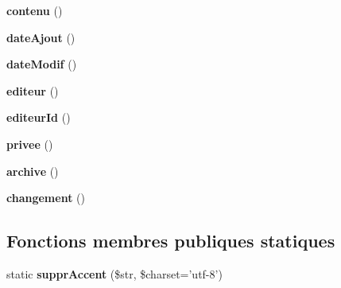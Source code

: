 \begin{DoxyCompactItemize}
\item 
\hypertarget{class_library_1_1_entities_1_1_news_a1837ef17e2289675cef00ceefe715ade}{{\bfseries contenu} ()}\label{class_library_1_1_entities_1_1_news_a1837ef17e2289675cef00ceefe715ade}

\item 
\hypertarget{class_library_1_1_entities_1_1_news_af9f7115d1008cf7fe82608563457e485}{{\bfseries date\+Ajout} ()}\label{class_library_1_1_entities_1_1_news_af9f7115d1008cf7fe82608563457e485}

\item 
\hypertarget{class_library_1_1_entities_1_1_news_aa2b1bf1abd3f44a94a51c35a80e3ecc4}{{\bfseries date\+Modif} ()}\label{class_library_1_1_entities_1_1_news_aa2b1bf1abd3f44a94a51c35a80e3ecc4}

\item 
\hypertarget{class_library_1_1_entities_1_1_news_a6f5f53e0839fa2d108dc51f37eb38531}{{\bfseries editeur} ()}\label{class_library_1_1_entities_1_1_news_a6f5f53e0839fa2d108dc51f37eb38531}

\item 
\hypertarget{class_library_1_1_entities_1_1_news_a7dcec24fe4bb7b75e2a24d5d2d1790bb}{{\bfseries editeur\+Id} ()}\label{class_library_1_1_entities_1_1_news_a7dcec24fe4bb7b75e2a24d5d2d1790bb}

\item 
\hypertarget{class_library_1_1_entities_1_1_news_a8281469f254147a5d1710037d13ae2b4}{{\bfseries privee} ()}\label{class_library_1_1_entities_1_1_news_a8281469f254147a5d1710037d13ae2b4}

\item 
\hypertarget{class_library_1_1_entities_1_1_news_a7f0a532bcfcfb4cce60a17f21276e395}{{\bfseries archive} ()}\label{class_library_1_1_entities_1_1_news_a7f0a532bcfcfb4cce60a17f21276e395}

\item 
\hypertarget{class_library_1_1_entities_1_1_news_a25b500de66d21904f4c606116a7b9b8d}{{\bfseries changement} ()}\label{class_library_1_1_entities_1_1_news_a25b500de66d21904f4c606116a7b9b8d}

\end{DoxyCompactItemize}
\subsection*{Fonctions membres publiques statiques}
\begin{DoxyCompactItemize}
\item 
\hypertarget{class_library_1_1_entities_1_1_news_a899b0048d8016c89a872b6ad781e3352}{static {\bfseries suppr\+Accent} (\$str, \$charset='utf-\/8')}\label{class_library_1_1_entities_1_1_news_a899b0048d8016c89a872b6ad781e3352}

\end{DoxyCompactItemize}
